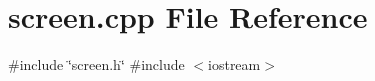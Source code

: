 \section{screen.\+cpp File Reference}
\label{screen_8cpp}
{\ttfamily \#include \char`\"{}screen.\+h\char`\"{}}\newline
{\ttfamily \#include $<$iostream$>$}\newline
